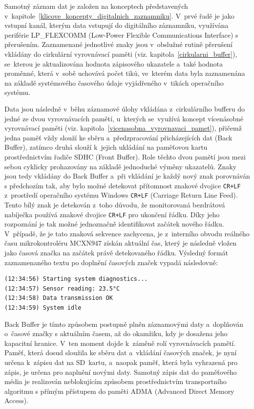 Samotný záznam dat je založen na konceptech představených v~kapitole~\ref{klicove_koncepty_digitalnich_zaznamniku}. V~prvé řadě je jako vstupní kanál, kterým data vstupují do digitálního záznamníku, využívána periférie LP\_FLEXCOMM (Low-Power Flexible Communications Interface) s přerušením. Zaznamenané jednotlivé znaky jsou v~obslužné rutině přerušení vkládány do cirkulární vyrovnávací paměti (viz. kapitola~\ref{cirkularni_buffer}), se~kterou je aktualizována hodnota zápisového ukazatele a~také hodnota proměnné, která v~sobě uchovává počet tiků, ve~kterém data byla zaznamenána na základě systémového časového údaje vyjádřeného v~tikách operačního systému.

\newpage

Data jsou následně v~běhu záznamové úlohy vkládána z~cirkulárního bufferu do jedné ze dvou vyrovnávacích pamětí, u~kterých se~využívá koncept vícenásobné vyrovnávací paměti (viz. kapitola~\ref{vicenasobna_vyrovnavaci_pamet}), přičemž jedna paměť vždy slouží ke sběru a~předzpracování přicházejících dat (Back Buffer), zatímco druhá slouží k~jejich ukládání na paměťovou kartu prostřednictvím řadiče SDHC (Front Buffer). Role těchto dvou pamětí jsou mezi sebou cyklicky prohazovány na základě jednoduché výměny ukazatelů. Znaky jsou tedy vkládány do Back Buffer a~při vkládání je každý nový znak porovnáván s předchozím tak, aby bylo možné detekovat přítomnost znakové dvojice \texttt{CR+LF} z~prostředí operačního systému Windows \texttt{CR+LF} (Carriage Return Line Feed). Tento bílý znak je detekován z~toho důvodu, že monitorovaná bezdrátová nabíječka používá znakové dvojice \texttt{CR+LF} pro ukončení řádku. Díky jeho rozpoznání je tak možné jednoznačně identifikovat začátek nového řádku. V~případě, že je tato znaková sekvence zachycena, je z~interního obvodu reálného času mikrokontroléru MCXN947 získán aktuální čas, který je následně vložen jako časová značka na začátek právě detekovaného řádku. Výsledný formát zaznamenaného textu po doplnění časových značek vypadá následovně:

\begin{verbatim}
(12:34:56) Starting system diagnostics...
(12:34:57) Sensor reading: 23.5°C
(12:34:58) Data transmission OK
(12:34:59) System idle
\end{verbatim}

Back Buffer je tímto způsobem postupně plněn záznamovými daty a~doplňován o~časové značky s aktuálním časem, až do okamžiku, kdy je dosažena jeho kapacitní hranice. V~ten moment dojde k~záměně rolí vyrovnávacích pamětí. Paměť, která dosud sloužila ke sběru dat a~vkládání časových značek, je nyní určena k~zápisu dat na SD~kartu, a~naopak paměť, která byla vyhrazená pro zápis, je určena pro naplnění novými daty. Samotný zápis dat do paměťového média je realizován neblokujícím způsobem prostřednictvím transportního algoritmu s přímým přístupem do paměti ADMA (Advanced Direct Memory Access).~\cite{nxp_MCX_Nx4x_Reference_Manual}

